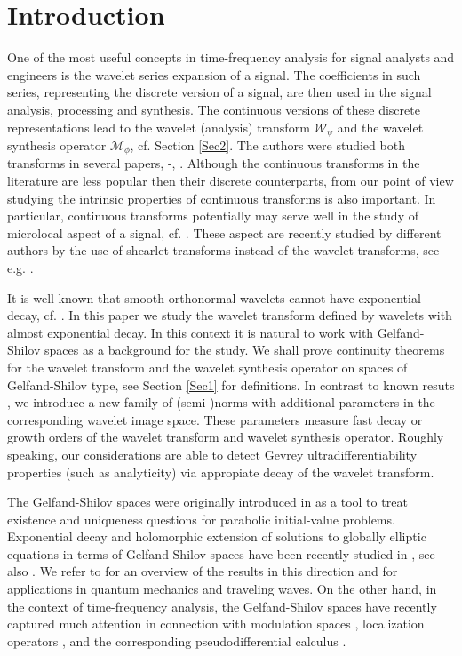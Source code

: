 \documentclass[reqno,12pt]{amsart}
\theoremstyle{plain}
\theoremstyle{definition}
\theoremstyle{remark}
\begin{document}
\maketitle

\section{Introduction}

One of the most useful concepts in time-frequency analysis for signal analysts and engineers
is the wavelet series expansion of a signal.
The coefficients in such series, representing the discrete version of a signal,
are then used in the signal analysis, processing and synthesis.
The continuous versions
of these discrete representations lead to the wavelet (analysis) transform
$ \mathcal{W}_{\psi}$ and the wavelet synthesis operator $\mathcal{M}_{\phi}$, cf. Section \ref{Sec2}.
The authors were
studied both transforms in several papers, \cite{PRV}-\cite{RT}, \cite{VPR}.
Although the continuous transforms
in the literature are less popular then their discrete counterparts,
from our point of view studying the intrinsic
properties of  continuous transforms is also important.
In particular, continuous transforms potentially may serve well in the study of
microlocal aspect of a signal, cf. \cite{PVul}.
These aspect are recently studied by different authors by the use of shearlet transforms
instead of the wavelet transforms, see e.g.    \cite{DK, KL}.

It is well known that smooth orthonormal wavelets cannot have
exponential decay, cf. \cite{Dau,DzH, HW}.
In this paper we study the
wavelet transform defined by wavelets with almost exponential decay.
In this context it is natural to work with Gelfand-Shilov spaces
as a background for the study. We shall prove continuity theorems
for the wavelet transform and the wavelet synthesis operator on spaces of
Gelfand-Shilov type, see Section \ref{Sec1} for definitions. In
contrast to known resuts \cite{hol1, pa06, PRV, RT}, we introduce
a new family of (semi-)norms with additional parameters in the corresponding wavelet image space. These parameters measure fast decay or growth orders of the wavelet
transform and wavelet synthesis operator. Roughly speaking, our considerations are able to detect Gevrey ultradifferentiability properties (such as analyticity) via appropiate decay of the wavelet transform.

\par

The Gelfand-Shilov spaces were originally introduced in \cite{GS} as a tool to treat existence and uniqueness questions for parabolic initial-value problems.
Exponential decay and holomorphic extension of solutions to globally elliptic equations
in terms of Gelfand-Shilov spaces have been recently studied in \cite{CGR-1,CGR-2}, see also \cite{BL}.
We refer to \cite{NR} for an overview of the results in this direction
and for applications in quantum mechanics and traveling waves.
On the other hand, in the context of time-frequency analysis, the Gelfand-Shilov spaces
have recently captured much attention in connection with modulation spaces
\cite{Gro,GZ}, localization operators \cite{CPRT},
and the corresponding pseudodifferential calculus \cite{Toft-1,Toft-2}.
\end{document}
